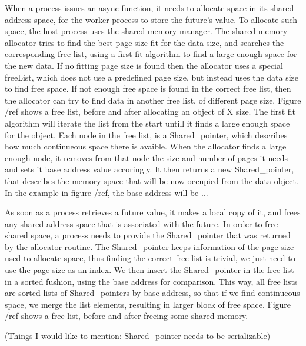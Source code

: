 When a process issues an async function, it needs to allocate space in its shared address space, for the worker process to store the future's value.  To allocate such space, the host process uses the shared memory manager. 
The shared memory allocator tries to find the best page size
fit for the data size, and searches the corresponding free list, using a first fit algorithm to find a large 
enough space for the new data. If no fitting page size is found then the allocator uses a special freeList, 
which does not use a predefined page size, but instead uses the data size to find free space.  If not enough free
space is found in the correct free list, then the allocator can try to find data in another free list, of different
page size.  Figure /ref shows a free list, before and after allocating an object of X size.  The first fit algorithm
will iterate the list from the start untill it finds a large enough space for the object.  Each node in the free list,
is a Shared\_pointer, which describes how much continueous space there is avaible.  When the allocator finds a large
enough node, it removes from that node the size and number of pages it needs and sets it base address value accoringly.
It then returns a new Shared\_pointer, that describes the memory space that will be now occupied from the data object.
In the example in figure /ref, the base address will be ...


As soon as a process retrieves a future value, it makes a local copy of it, and frees any shared address space
that is associated with the future.  In order to free shared space, a process needs to provide the Shared\_pointer
that was returned by the allocator routine.  The Shared\_pointer keeps information of the page size used to 
allocate space, thus finding the correct free list is trivial, we just need to use the page size as an index.
We then insert the Shared\_pointer in the free list in a sorted fushion, using the base address for comparison.
This way, all free lists are sorted lists of Shared\_pointers by base address, so that if we find continueous
space, we merge the list elements, resulting in larger block of free space.  Figure /ref shows a free list, before
and after freeing some shared memory.

(Things I would like to mention: Shared\_pointer needs to be serializable)

